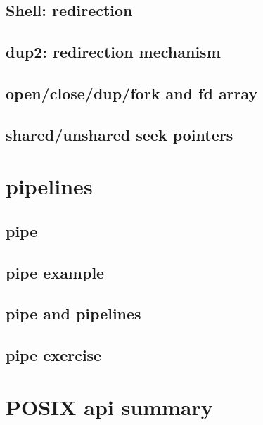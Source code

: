 \subsection{Shell: redirection}




\subsection{dup2: redirection mechanism}



\subsection{open/close/dup/fork and fd array}


\subsection{shared/unshared seek pointers}


\section{pipelines}

\subsection{pipe}



\subsection{pipe example}


\subsection{pipe and pipelines}


\subsection{pipe exercise}

\section{POSIX api summary}





% 
% 




